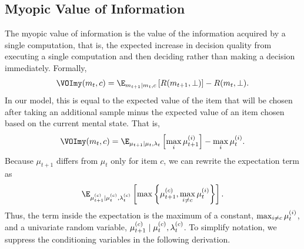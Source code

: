 \subsection{Myopic Value of Information}
The myopic value of information is the value of the information acquired by a single computation, that is, the expected increase in decision quality from executing a single computation and then deciding rather than making a decision immediately. Formally,
%
%
\begin{equation*}
  \VOImy(m_t,c) = \E_{m_{t+1} \mid m_t, c}\left[
    R(m_{t+1},\bot)
  \right] - R(m_t, \bot).
\end{equation*}
%
In our model, this is equal to the expected value of the item that will be chosen after taking an additional sample minus the expected value of an item chosen based on the current mental state. That is,
%
%
\begin{equation*}
  \VOImy(m_t, c) = \E_{\mu_{t+1} \mid \mu_t, \lambda_t} \left[
    \max_i \mu_{t+1}^{(i)}
\right] - \max_i \mu_t^{(i)}.
\end{equation*}
%
Because $\mu_{t+1}$ differs from $\mu_t$ only for item $c$, we can rewrite the expectation term as
%
\begin{equation}
  \label{eq:myopicmax}
  \E_{\postmean \mid \currentmean, \currentlam} \left[ 
    \max \left\{ \postmean,\nextbest \right\} 
  \right].
\end{equation}
%
Thus, the term inside the expectation is the maximum of a constant, $\max_{i \neq c} \mu_t^{(i)}$, and a univariate random variable, $\mu_{t+1}^{(c)} \mid \mu_{t}^{(c)}, \lambda_{t}^{(c)}$. To simplify notation, we suppress the conditioning variables in the following derivation.

